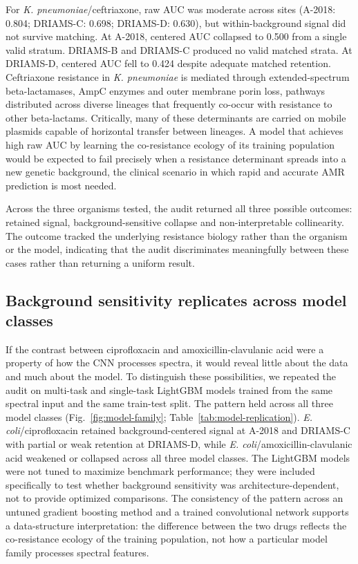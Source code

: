 \documentclass[11pt]{article}
\begin{document}
For \textit{K. pneumoniae}/ceftriaxone, raw AUC was moderate across sites (A-2018: 0.804; DRIAMS-C: 0.698; DRIAMS-D: 0.630), but within-background signal did not survive matching. At A-2018, centered AUC collapsed to 0.500 from a single valid stratum. DRIAMS-B and DRIAMS-C produced no valid matched strata. At DRIAMS-D, centered AUC fell to 0.424 despite adequate matched retention. Ceftriaxone resistance in \textit{K. pneumoniae} is mediated through extended-spectrum beta-lactamases, AmpC enzymes and outer membrane porin loss, pathways distributed across diverse lineages that frequently co-occur with resistance to other beta-lactams. Critically, many of these determinants are carried on mobile plasmids capable of horizontal transfer between lineages. A model that achieves high raw AUC by learning the co-resistance ecology of its training population would be expected to fail precisely when a resistance determinant spreads into a new genetic background, the clinical scenario in which rapid and accurate AMR prediction is most needed.

Across the three organisms tested, the audit returned all three possible outcomes: retained signal, background-sensitive collapse and non-interpretable collinearity. The outcome tracked the underlying resistance biology rather than the organism or the model, indicating that the audit discriminates meaningfully between these cases rather than returning a uniform result.

\subsection*{Background sensitivity replicates across model classes}

If the contrast between ciprofloxacin and amoxicillin-clavulanic acid were a property of how the CNN processes spectra, it would reveal little about the data and much about the model. To distinguish these possibilities, we repeated the audit on multi-task and single-task LightGBM models trained from the same spectral input and the same train-test split. The pattern held across all three model classes (Fig.~\ref{fig:model-family}; Table~\ref{tab:model-replication}). \textit{E. coli}/ciprofloxacin retained background-centered signal at A-2018 and DRIAMS-C with partial or weak retention at DRIAMS-D, while \textit{E. coli}/amoxicillin-clavulanic acid weakened or collapsed across all three model classes. The LightGBM models were not tuned to maximize benchmark performance; they were included specifically to test whether background sensitivity was architecture-dependent, not to provide optimized comparisons. The consistency of the pattern across an untuned gradient boosting method and a trained convolutional network supports a data-structure interpretation: the difference between the two drugs reflects the co-resistance ecology of the training population, not how a particular model family processes spectral features.
\end{document}
